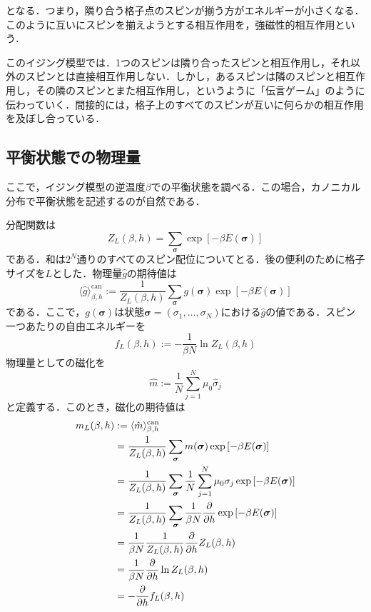 \documentclass[a4paper,11pt]{jsreport}
\begin{document}
となる．つまり，隣り合う格子点のスピンが揃う方がエネルギーが小さくなる．このように互いにスピンを揃えようとする相互作用を，強磁性的相互作用という．\par
このイジング模型では．1つのスピンは隣り合ったスピンと相互作用し，それ以外のスピンとは直接相互作用しない．しかし，あるスピンは隣のスピンと相互作用し，その隣のスピンとまた相互作用し，というように「伝言ゲーム」のように伝わっていく．間接的には，格子上のすべてのスピンが互いに何らかの相互作用を及ぼし合っている．

\subsection{平衡状態での物理量}
ここで，イジング模型の逆温度$\beta$での平衡状態を調べる．この場合，カノニカル分布で平衡状態を記述するのが自然である．\par
分配関数は
\begin{equation}
  Z_L(\beta, h) = \sum_{\bm{\sigma}} \exp{[-\beta E(\bm{\sigma})]} \label{イジング分配関数}
\end{equation}
である．和は$2^N$通りのすべてのスピン配位についてとる．後の便利のために格子サイズを$L$とした．物理量$\hat{g}$の期待値は
\begin{equation}
  \langle \hat{g} \rangle_{\beta, h}^{\text{can}}
  := \frac{1}{Z_L(\beta, h)}  \sum_{\bm{\sigma}} g(\bm{\sigma}) \exp{[-\beta E(\bm{\sigma})]}
\end{equation}
である．ここで，$g(\bm{\sigma})$は状態$\bm{\sigma}=(\sigma_1,\dots,\sigma_N)$における$\hat{g}$の値である．スピン一つあたりの自由エネルギーを
\begin{equation}
  f_L(\beta, h) := -\frac{1}{\beta N} \ln{Z_L(\beta, h)} \label{自由エネルギー}
\end{equation}
物理量としての磁化を
\begin{equation}
  \hat{m} := \frac{1}{N} \sum_{j=1}^{N} \mu_0 \hat{\sigma}_j
\end{equation}
と定義する．このとき，磁化の期待値は
\begin{align}
   m_L(\beta, h) &:= \langle \hat{m} \rangle_{\beta, h}^{\text{can}} \notag                                                                                       \\
   & = \frac{1}{Z_L(\beta, h)} \sum_{\bm{\sigma}} m(\bm{\sigma}) \exp{[-\beta E(\bm{\sigma})]} \notag                \\
   & = \frac{1}{Z_L(\beta, h)} \sum_{\bm{\sigma}} \frac{1}{N} \sum_{j=1}^N \mu_0 \sigma_j \exp{[-\beta E(\bm{\sigma})]} \notag      \\
   & = \frac{1}{Z_L(\beta, h)} \sum_{\bm{\sigma}} \frac{1}{\beta N} \frac{\partial}{\partial h} \exp{[-\beta E(\bm{\sigma})]}\notag \\
   & = \frac{1}{\beta N} \frac{1}{Z_L(\beta, h)} \frac{\partial}{\partial h} Z_L(\beta, h)  \notag                                                                 \\
   & = \frac{1}{\beta N}\frac{\partial}{\partial h} \ln{Z_L (\beta, h)} \notag                                                                                     \\
   & = -\frac{\partial}{\partial h} f_L(\beta, h) \label{磁化と自由エネルギーの関係式}
\end{align}
\end{document}
